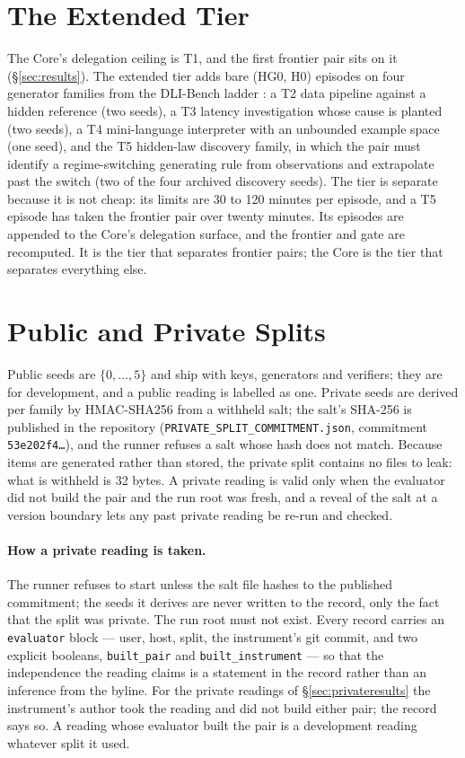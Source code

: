 \documentclass[11pt]{article}
\theoremstyle{definition}
\begin{document}
\section{The Extended Tier}\label{sec:extended}

The Core's delegation ceiling is T1, and the first frontier pair sits on it (\S\ref{sec:results}). The extended tier adds bare (HG0, H0) episodes on four generator families from the DLI-Bench ladder \citep{yang2026dlibench}: a T2 data pipeline against a hidden reference (two seeds), a T3 latency investigation whose cause is planted (two seeds), a T4 mini-language interpreter with an unbounded example space (one seed), and the T5 hidden-law discovery family, in which the pair must identify a regime-switching generating rule from observations and extrapolate past the switch (two of the four archived discovery seeds). The tier is separate because it is not cheap: its limits are 30 to 120 minutes per episode, and a T5 episode has taken the frontier pair over twenty minutes. Its episodes are appended to the Core's delegation surface, and the frontier and gate are recomputed. It is the tier that separates frontier pairs; the Core is the tier that separates everything else.

\section{Public and Private Splits}\label{sec:splits}

Public seeds are $\{0,\ldots,5\}$ and ship with keys, generators and verifiers; they are for development, and a public reading is labelled as one. Private seeds are derived per family by HMAC-SHA256 from a withheld salt; the salt's SHA-256 is published in the repository (\texttt{PRIVATE\_SPLIT\_COMMITMENT.json}, commitment \texttt{53e202f4\ldots}), and the runner refuses a salt whose hash does not match. Because items are generated rather than stored, the private split contains no files to leak: what is withheld is 32 bytes. A private reading is valid only when the evaluator did not build the pair and the run root was fresh, and a reveal of the salt at a version boundary lets any past private reading be re-run and checked.

\paragraph{How a private reading is taken.} The runner refuses to start unless the salt file hashes to the published commitment; the seeds it derives are never written to the record, only the fact that the split was private. The run root must not exist. Every record carries an \texttt{evaluator} block --- user, host, split, the instrument's git commit, and two explicit booleans, \texttt{built\_pair} and \texttt{built\_instrument} --- so that the independence the reading claims is a statement in the record rather than an inference from the byline. For the private readings of \S\ref{sec:privateresults} the instrument's author took the reading and did not build either pair; the record says so. A reading whose evaluator built the pair is a development reading whatever split it used.
\end{document}

